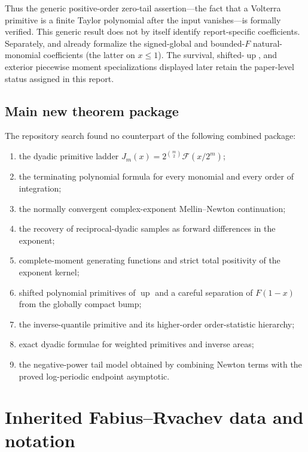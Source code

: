 \documentclass[11pt,oneside]{article}
\theoremstyle{definition}
\theoremstyle{remark}
\newcommand{\Up}{\operatorname{up}}
\newcommand{\1}{\mathbf 1}
\begin{document}
Thus the generic positive-order zero-tail assertion---the fact that a Volterra primitive is
a finite Taylor polynomial after the input vanishes---is formally verified.  This generic
result does not by itself identify report-specific coefficients.  Separately,
 and
 already formalize the signed-global
and bounded-$F$ natural-monomial coefficients (the latter on $x\le1$).  The survival,
shifted-\(\Up\), and exterior piecewise moment specializations displayed later retain the
paper-level status assigned in this report.

\subsection{Main new theorem package}

The repository search found no counterpart of the following combined package:

\begin{enumerate}
\item the dyadic primitive ladder $J_m(x)=2^{\binom m2}\mathcal F(x/2^m)$;
\item the terminating polynomial formula for every monomial and every order of integration;
\item the normally convergent complex-exponent Mellin--Newton continuation;
\item the recovery of reciprocal-dyadic samples as forward differences in the exponent;
\item complete-moment generating functions and strict total positivity of the exponent kernel;
\item shifted polynomial primitives of $\Up$ and a careful separation of $F(1-x)$ from the
      globally compact bump;
\item the inverse-quantile primitive and its higher-order order-statistic hierarchy;
\item exact dyadic formulae for weighted primitives and inverse areas;
\item the negative-power tail model obtained by combining Newton terms with the proved
      log-periodic endpoint asymptotic.
\end{enumerate}

\section{Inherited Fabius--Rvachev data and notation}
\label{p3:sec:background}
\end{document}
